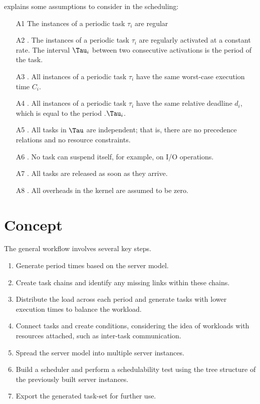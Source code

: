 \textcite[p. 70f]{buttazzoHardRealTimeComputing2024} explains some assumptions to consider in the scheduling:
\begin{enumerate}
	\item[A1] The instances of a periodic task $\tau_i$ are regular
	\item[A2]. The instances of a periodic task $\tau_i$ are regularly activated at a constant rate. The interval $\Tau_i$ between two consecutive activations is the period of the task. 
	\item[A3]. All instances of a periodic task $\tau_i$ have the same worst-case execution time $C_i$.
	\item[A4]. All instances of a periodic task $\tau_i$ have the same relative deadline $d_i$, which is equal to the period .$\Tau_i$. 
	\item[A5]. All tasks in $\Tau$ are independent; that is, there are no precedence relations and no resource constraints.
	\item[A6]. No task can suspend itself, for example, on I/O operations. 
	\item[A7]. All tasks are released as soon as they arrive. 
	\item[A8]. All overheads in the kernel are assumed to be zero. 
\end{enumerate}


\cite{dar-tzenpengAssignmentSchedulingCommunicating1997}


\section{Concept}\label{sec:concept}
The general workflow involves several key steps. 
\begin{enumerate}
	\item Generate period times based on the server model. 
	\item Create task chains and identify any missing links within these chains. 
	\item Distribute the load across each period and generate tasks with lower execution times to balance the workload.
	\item Connect tasks and create conditions, considering the idea of workloads with resources attached, such as inter-task communication. 
	\item Spread the server model into multiple server instances. 
	\item Build a scheduler and perform a schedulability test using the tree structure of the previously built server instances.
	\item Export the generated task-set for further use.
\end{enumerate}

